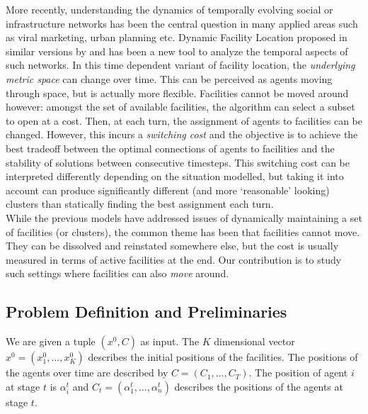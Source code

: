 More recently, understanding the dynamics of temporally evolving social or 
infrastructure networks has been the central question in many applied areas such 
as viral marketing, urban planning etc. Dynamic Facility Location 
proposed in similar versions by \cite{EMS2014} and \cite{fernandes2013dynamic} has been a new tool to analyze the temporal aspects 
of such networks. In this time dependent variant of facility location, the \emph{underlying metric space} can change over time. This can be perceived as agents moving through space, but is actually more flexible. Facilities cannot be moved around however: amongst the set of available facilities, the algorithm can select a subset to open at a cost. Then, at each turn, the assignment of agents to facilities can be changed. However, this incurs a \emph{switching cost} and the objective is to achieve the best tradeoff between the 
optimal connections of agents to facilities and the stability of solutions between  
consecutive timesteps. This switching cost can be interpreted differently depending on the situation modelled, but taking it into account can produce significantly different (and more `reasonable' looking) clusters than statically finding the best assignment each turn. \\

While the previous models have addressed issues of dynamically
maintaining a set of facilities (or clusters), the common theme has
been that facilities cannot move. They can be dissolved and reinstated
somewhere else, but the cost is usually measured in terms of active
facilities at the end. Our contribution is to study such settings where facilities can also \emph{move} around.

\subsection{Problem Definition and Preliminaries}
\label{sec:prelim}

\begin{definition}\label{d:problem}
We are given a tuple $(x^0, C)$ as input. The $K$ dimensional vector 
$x^0=(x^0_1,\ldots,x^0_K)$
describes the initial positions of the facilities. The positions of the agents over 
time
are described by $C = (C_1, \ldots, C_T)$. The position of agent $i$ at stage $t$ 
is
$\alpha_i^t$ and $C_t = (\alpha_1^t, \ldots , \alpha_n^t)$ describes the 
positions 
of the agents at stage $t$.
\end{definition}


